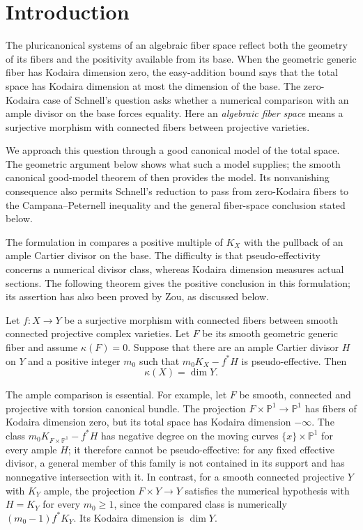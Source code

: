 \section{Introduction}
\label{sec:introduction}

The pluricanonical systems of an algebraic fiber space reflect both
the geometry of its fibers and the positivity available from its base.
When the geometric generic fiber has Kodaira dimension zero, the
easy-addition bound says that the total space has Kodaira dimension
at most the dimension of the base. The zero-Kodaira case of Schnell's
question asks whether a numerical comparison with an ample divisor on
the base forces equality.
Here an \emph{algebraic fiber space} means a surjective morphism with
connected fibers between projective varieties.

We approach this question through a good canonical model of the total
space. The geometric argument below shows what such a model supplies;
the smooth canonical good-model theorem of
\cite[Corollary~11.2]{LogAbundance2026} then provides the model.
Its nonvanishing consequence also permits Schnell's reduction to pass
from zero-Kodaira fibers to the Campana--Peternell inequality and the
general fiber-space conclusion stated below.

The formulation in \cite[Conjecture~1.2]{Kim2025} compares
a positive multiple of $K_X$ with the pullback of an ample Cartier divisor on the base.
The difficulty is that pseudo-effectivity concerns a numerical divisor
class, whereas Kodaira dimension measures actual sections. The
following theorem gives the positive conclusion in this formulation;
its assertion has also been proved by Zou, as discussed below.

\begin{theorem}
\label{thm:schnell}
Let $f\colon X\to Y$ be a surjective morphism with connected fibers
between smooth connected projective complex varieties. Let $F$ be its
smooth geometric generic fiber and assume $\kappa(F)=0$. Suppose that
there are an ample Cartier divisor $H$ on $Y$ and a positive integer
$m_0$ such that $m_0K_X-f^*H$ is pseudo-effective. Then
\[
 \kappa(X)=\dim Y.
\]
\end{theorem}

The ample comparison is essential. For example, let $F$ be smooth,
connected and projective with torsion canonical bundle. The projection
$F\times\mathbb P^1\to\mathbb P^1$ has fibers of Kodaira dimension
zero, but its total space has Kodaira dimension $-\infty$.
The class $m_0K_{F\times\mathbb P^1}-f^*H$ has negative degree on
the moving curves $\{x\}\times\mathbb P^1$ for every ample $H$;
it therefore cannot be pseudo-effective: for any fixed effective
divisor, a general member of this family is not contained in its
support and has nonnegative intersection with it. In contrast, for a
smooth connected projective $Y$ with $K_Y$ ample, the projection
$F\times Y\to Y$ satisfies the numerical
hypothesis with $H=K_Y$ for every $m_0\geq1$, since the compared
class is numerically $(m_0-1)f^*K_Y$. Its Kodaira dimension is
$\dim Y$.

